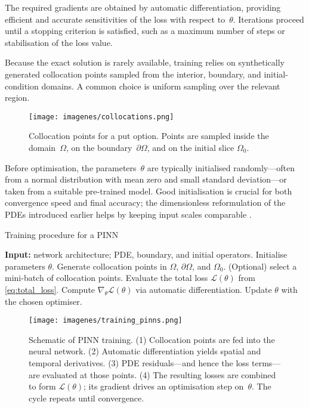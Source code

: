\documentclass[12pt]{report} %
\theoremstyle{plain}           %
\theoremstyle{definition}      %
\theoremstyle{remark}          %
\begin{document}
The required gradients are obtained by automatic differentiation, providing
efficient and accurate sensitivities of the loss with respect to~$\theta$.
Iterations proceed until a stopping criterion is satisfied, such as a maximum
number of steps or stabilisation of the loss value.

Because the exact solution is rarely available, training relies on
synthetically generated collocation points sampled from the interior,
boundary, and initial-condition domains.  A common choice is uniform sampling
over the relevant region.

\begin{figure}
  \centering
  \texttt{[image: imagenes/collocations.png]}
  \caption{Collocation points for a put option.  Points are sampled inside the
  domain~$\Omega$, on the boundary~$\partial\Omega$, and on the initial slice
  $\Omega_0$.}
  \label{fig:collocations}
\end{figure}

Before optimisation, the parameters~$\theta$ are typically initialised
randomly—often from a normal distribution with mean zero and small standard
deviation—or taken from a suitable pre-trained model. Good initialisation is
crucial for both convergence speed and final accuracy; the dimensionless
reformulation of the PDEs introduced earlier helps by keeping input scales
comparable \cite{nondimensionalinputs2025}.

\begin{algorithm}[H]
  \caption{Training procedure for a PINN}
  \begin{algorithmic}[1]
    \STATE \textbf{Input:} network architecture; PDE, boundary, and initial operators.
    \STATE Initialise parameters $\theta$.
    \STATE Generate collocation points in $\Omega$, $\partial\Omega$, and $\Omega_0$.
      \STATE (Optional) select a mini-batch of collocation points.
      \STATE Evaluate the total loss $\mathcal{L}(\theta)$ from \eqref{eq:total_loss}.
      \STATE Compute $\nabla_\theta\mathcal{L}(\theta)$ via automatic differentiation.
      \STATE Update $\theta$ with the chosen optimiser.
    \ENDWHILE
  \end{algorithmic}
  \label{alg:training_pinns}
\end{algorithm}

\begin{figure}
  \centering
  \texttt{[image: imagenes/training\_pinns.png]}
  \caption{Schematic of PINN training.  
  (1) Collocation points are fed into the neural network.  
  (2) Automatic differentiation yields spatial and temporal derivatives.  
  (3) PDE residuals—and hence the loss terms—are evaluated at those points.  
  (4) The resulting losses are combined to form $\mathcal{L}(\theta)$; its
  gradient drives an optimisation step on~$\theta$.  The cycle repeats until
  convergence.}
  \label{fig:pinns_training}
\end{figure}
\end{document}
